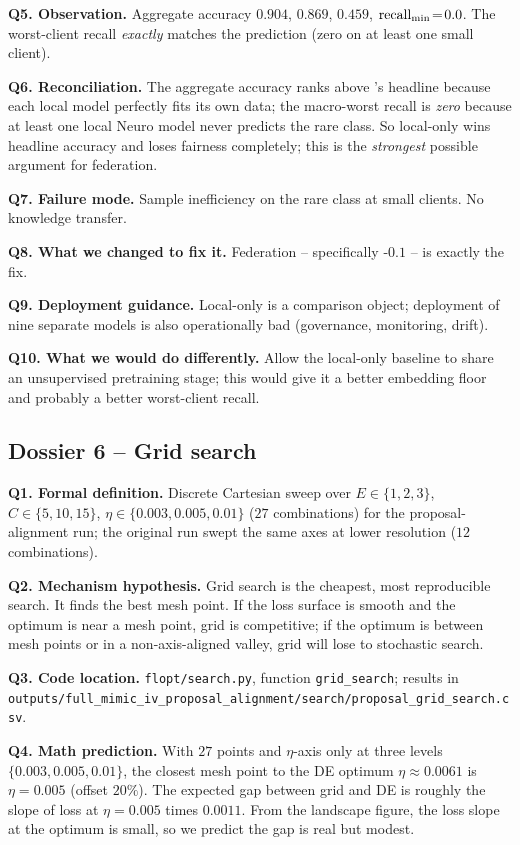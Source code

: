 \textbf{Q5. Observation.}
Aggregate accuracy $0.904$, \auroc{} $0.869$, \auprc{} $0.459$,
$\text{recall}_{\min}{}\!=\!0.0$. The worst-client recall \emph{exactly} matches
the prediction (zero on at least one small client).

\textbf{Q6. Reconciliation.}
The aggregate accuracy ranks above \fedavg{}'s headline because each
local model perfectly fits its own data; the macro-worst recall is
\emph{zero} because at least one local Neuro model never predicts
the rare class. So local-only wins headline accuracy and loses
fairness completely; this is the \emph{strongest} possible argument
for federation.

\textbf{Q7. Failure mode.}
Sample inefficiency on the rare class at small clients. No knowledge
transfer.

\textbf{Q8. What we changed to fix it.}
Federation -- specifically \fedprox{}-$0.1$ -- is exactly the fix.

\textbf{Q9. Deployment guidance.}
Local-only is a comparison object; deployment of nine separate
models is also operationally bad (governance, monitoring, drift).

\textbf{Q10. What we would do differently.}
Allow the local-only baseline to share an unsupervised pretraining
stage; this would give it a better embedding floor and probably a
better worst-client recall.

\subsection{Dossier 6 -- Grid search}
\label{sec:dossier-grid}

\textbf{Q1. Formal definition.}
Discrete Cartesian sweep over $E \!\in\! \{1,2,3\}$,
$C \!\in\! \{5,10,15\}$, $\eta \!\in\! \{0.003, 0.005, 0.01\}$ ($27$
combinations) for the proposal-alignment run; the original run swept
the same axes at lower resolution ($12$ combinations).

\textbf{Q2. Mechanism hypothesis.}
Grid search is the cheapest, most reproducible search. It finds the
best mesh point. If the loss surface is smooth and the optimum is
near a mesh point, grid is competitive; if the optimum is between
mesh points or in a non-axis-aligned valley, grid will lose to
stochastic search.

\textbf{Q3. Code location.}
\texttt{flopt/search.py}, function \texttt{grid\_search}; results in
\texttt{outputs/full\_mimic\_iv\_proposal\_alignment/search/proposal\_grid\_search.csv}.

\textbf{Q4. Math prediction.}
With $27$ points and $\eta$-axis only at three levels
$\{0.003, 0.005, 0.01\}$, the closest mesh point to the DE optimum
$\eta\!\approx\!0.0061$ is $\eta\!=\!0.005$ (offset $20\%$). The
expected gap between grid and DE is roughly the slope of loss at
$\eta\!=\!0.005$ times $0.0011$. From the landscape figure, the loss
slope at the optimum is small, so we predict the gap is real but
modest.

